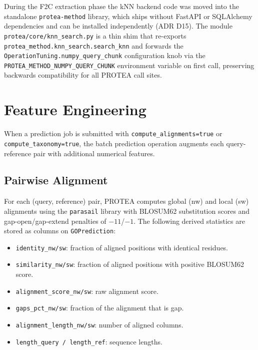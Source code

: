 During the F2C extraction phase the kNN backend code was moved into the
standalone \texttt{protea-method} library, which ships without FastAPI or
SQLAlchemy dependencies and can be installed independently (ADR D15). The
module \texttt{protea/core/knn\_search.py} is a thin shim that re-exports
\texttt{protea\_method.knn\_search.search\_knn} and forwards the
\texttt{OperationTuning.numpy\_query\_chunk} configuration knob via the
\texttt{PROTEA\_METHOD\_NUMPY\_QUERY\_CHUNK} environment variable on first
call, preserving backwards compatibility for all PROTEA call sites.

\section{Feature Engineering}
\label{sec:feature-engineering}

When a prediction job is submitted with \texttt{compute\_alignments=true} or
\texttt{compute\_taxonomy=true}, the batch prediction operation augments each
query-reference pair with additional numerical features.

\subsection{Pairwise Alignment}
\label{subsec:fe-alignment}

For each (query, reference) pair, PROTEA computes global (\gls{nw}) and local
(\gls{sw}) alignments using the \texttt{parasail} library with BLOSUM62
substitution scores and gap-open/gap-extend penalties of $-11$/$-1$.
The following derived statistics are stored as columns on \texttt{GOPrediction}:

\begin{itemize}
  \item \texttt{identity\_nw/sw}: fraction of aligned positions with identical
    residues.
  \item \texttt{similarity\_nw/sw}: fraction of aligned positions with positive
    BLOSUM62 score.
  \item \texttt{alignment\_score\_nw/sw}: raw alignment score.
  \item \texttt{gaps\_pct\_nw/sw}: fraction of the alignment that is gap.
  \item \texttt{alignment\_length\_nw/sw}: number of aligned columns.
  \item \texttt{length\_query / length\_ref}: sequence lengths.
\end{itemize}

